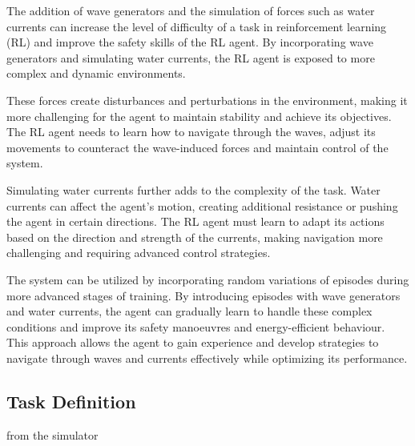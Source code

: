\begin{textblock}
The addition of wave generators and the simulation of forces such as water currents can increase the level of difficulty of a task in reinforcement learning (RL) and improve the safety skills of the RL agent. By incorporating wave generators and simulating water currents, the RL agent is exposed to more complex and dynamic environments.

These forces create disturbances and perturbations in the environment, making it more challenging for the agent to maintain stability and achieve its objectives. The RL agent needs to learn how to navigate through the waves, adjust its movements to counteract the wave-induced forces and maintain control of the system.

Simulating water currents further adds to the complexity of the task. Water currents can affect the agent's motion, creating additional resistance or pushing the agent in certain directions. The RL agent must learn to adapt its actions based on the direction and strength of the currents, making navigation more challenging and requiring advanced control strategies.

The system can be utilized by incorporating random variations of episodes during more advanced stages of training. By introducing episodes with wave generators and water currents, the agent can gradually learn to handle these complex conditions and improve its safety manoeuvres and energy-efficient behaviour. This approach allows the agent to gain experience and develop strategies to navigate through waves and currents effectively while optimizing its performance. 
\end{textblock}


\subsection{Task Definition}
{from the simulator}

